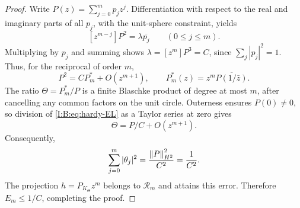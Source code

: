 \begin{proof}
Write $P(z)=\sum_{j=0}^mp_jz^j$.  Differentiation with respect to the real
and imaginary parts of all $p_j$, with the unit-sphere constraint, yields
\[
 [z^{m-j}]P^2=\lambda\overline{p_j}\qquad(0\le j\le m).
\]
Multiplying by $p_j$ and summing shows
$\lambda=[z^m]P^3=C$, since $\sum_j|p_j|^2=1$.
Thus, for the reciprocal of order $m$,
\begin{equation}
 P^2=C P_m^*+O(z^{m+1}),\qquad
 P_m^*(z)=z^m\overline{P(1/\bar z)}.
 \label{I:B:eq:hardy-EL}
\end{equation}
The ratio $\Theta=P_m^*/P$ is a finite Blaschke product of degree at most
$m$, after cancelling any common factors on the unit circle.  Outerness
ensures $P(0)\ne0$, so division of \eqref{I:B:eq:hardy-EL} as a Taylor series
at zero gives
\[
 \Theta=P/C+O(z^{m+1}).
\]
Consequently,
\[
 \sum_{j=0}^m|\theta_j|^2
 =\frac{\left\lVert P\right\rVert_{H^2}^2}{C^2}=\frac1{C^2}.
\]
The projection $h=P_{K_\Theta}z^m$ belongs to $\mathcal R_m$ and attains
this error.  Therefore $E_m\le1/C$, completing the proof.
\end{proof}
